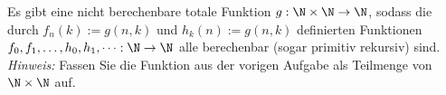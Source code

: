 
\begin{exercise}[200]

Es gibt eine nicht berechenbare totale Funktion $g: \N \times \N \to \N$, sodass
die durch $f_n(k) := g(n,k)$ und $h_k(n) := g(n,k)$ definierten Funktionen
$f_0,f_1,\dots,h_0,h_1,\dots: \N \to \N$ alle berechenbar (sogar primitiv rekursiv) sind. \\
\textit{Hinweis:} Fassen Sie die Funktion aus der vorigen Aufgabe als Teilmenge von
$\N \times \N$ auf.

\end{exercise}


\begin{solution}

\phantom{}

\end{solution}
